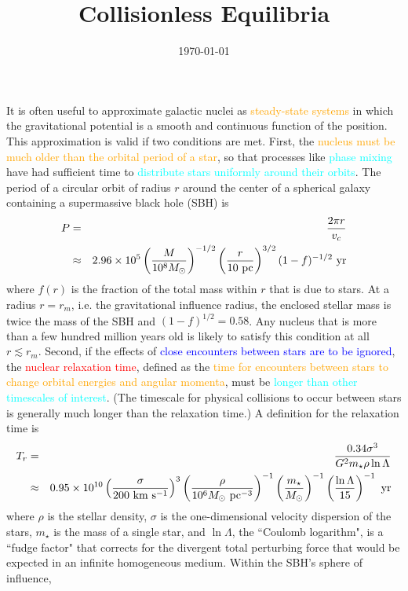 \documentclass[12pt,a4paper]{article}
\title{Collisionless Equilibria}
\author{}
\date{\today}
\begin{document}
\maketitle

\cite{2013degn.book.....M} It is often useful to approximate galactic nuclei as \textcolor{orange}{steady-state systems} in which the gravitational potential is a smooth and continuous function of the position. This approximation is valid if two conditions are met. First, the \textcolor{orange}{nucleus must be much older than the orbital period of a star}, so that processes like  \textcolor{cyan}{phase mixing} have had sufficient time to \textcolor{cyan}{distribute stars uniformly around their orbits}. The period of a circular orbit of radius $r$ around the center of a spherical galaxy containing a supermassive black hole (SBH) is
\begin{eqnarray}
\nonumber P &=& \frac{2\pi r}{v_c} \\
&\approx& 2.96\times 10^5 \left(\frac{M}{10^8 M_\odot} \right)^{-1/2} \left(\frac{r}{10 ~{\rm pc}} \right)^{3/2} (1 -f)^{-1/2} ~{\rm yr}
\end{eqnarray}
where $f(r)$ is the fraction of the total mass within $r$ that is due to stars. At a radius $r = r_m$, i.e. the gravitational influence radius, the enclosed stellar mass is twice the mass of the SBH and $(1-f)^{1/2} = 0.58$. Any nucleus that is more than a few hundred million years old is likely to satisfy this condition at all $r \lesssim r_m$. Second, if the effects of \textcolor{blue}{close encounters between stars are to be ignored}, the \textcolor{red}{nuclear relaxation time}, defined as the \textcolor{orange}{time for encounters between stars to change orbital energies and angular momenta}, must be \textcolor{cyan}{longer than other timescales of interest}. (The timescale for physical collisions to occur between stars is generally much longer than the relaxation time.) A definition for the relaxation time is
\begin{eqnarray}
\nonumber T_r &=& \frac{0.34 \sigma^3}{G^2 m_\star \rho \ln \Lambda} \\ 
&\approx& 0.95 \times 10^{10}  \left(\frac{\sigma}{200 ~{\rm km ~s^{-1}} } \right)^{3} \left(\frac{\rho}{10^6 M_\odot ~{\rm pc}^{-3} } \right)^{-1} \left(\frac{m_\star}{M_\odot} \right)^{-1} \left(\frac{\ln \Lambda}{15} \right)^{-1} ~{\rm yr}
\end{eqnarray}
where $\rho$ is the stellar density, $\sigma$ is the one-dimensional velocity dispersion of the stars, $m_\star$ is the mass of a single star, and $\ln \Lambda$, the ``Coulomb logarithm", is a ``fudge factor" that corrects for the divergent total perturbing force that would be expected in an infinite homogeneous medium. Within the SBH’s sphere of influence,
\end{document}
